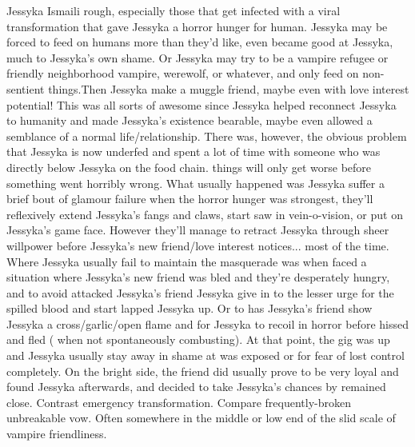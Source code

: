 \documentclass[12pt]{book}
\begin{document}
Jessyka Ismaili rough, especially those that get infected with a viral transformation that gave Jessyka a horror hunger for human. Jessyka may be forced to feed on humans more than they'd like, even became good at Jessyka, much to Jessyka's own shame. Or Jessyka may try to be a vampire refugee or friendly neighborhood vampire, werewolf, or whatever, and only feed on non-sentient things.Then Jessyka make a muggle friend, maybe even with love interest potential! This was all sorts of awesome since Jessyka helped reconnect Jessyka to humanity and made Jessyka's existence bearable, maybe even allowed a semblance of a normal life/relationship. There was, however, the obvious problem that Jessyka is now underfed and spent a lot of time with someone who was directly below Jessyka on the food chain. things will only get worse before something went horribly wrong. What usually happened was Jessyka suffer a brief bout of glamour failure when the horror hunger was strongest, they'll reflexively extend Jessyka's fangs and claws, start saw in vein-o-vision, or put on Jessyka's game face. However they'll manage to retract Jessyka through sheer willpower before Jessyka's new friend/love interest notices... most of the time. Where Jessyka usually fail to maintain the masquerade was when faced a situation where Jessyka's new friend was bled and they're desperately hungry, and to avoid attacked Jessyka's friend Jessyka give in to the lesser urge for the spilled blood and start lapped Jessyka up. Or to has Jessyka's friend show Jessyka a cross/garlic/open flame and for Jessyka to recoil in horror before hissed and fled ( when not spontaneously combusting). At that point, the gig was up and Jessyka usually stay away in shame at was exposed or for fear of lost control completely. On the bright side, the friend did usually prove to be very loyal and found Jessyka afterwards, and decided to take Jessyka's chances by remained close. Contrast emergency transformation. Compare frequently-broken unbreakable vow. Often somewhere in the middle or low end of the slid scale of vampire friendliness.
\end{document}
